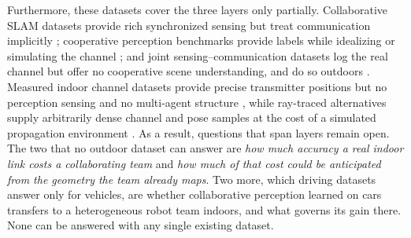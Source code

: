 \documentclass[journal]{IEEEtran}
\begin{document}
Furthermore, these datasets cover the three layers only partially.
Collaborative SLAM datasets provide rich synchronized sensing but
treat communication implicitly \cite{s3e,kimeramulti,coped};
cooperative perception benchmarks provide labels while idealizing or
simulating the channel \cite{opv2v,dairv2x,v2v4real}; and joint
sensing--communication datasets log the real channel but offer no
cooperative scene understanding, and do so outdoors
\cite{deepsense6g}. Measured indoor channel datasets provide precise
transmitter positions but no perception sensing and no multi-agent
structure \cite{dichasus}, while ray-traced alternatives supply
arbitrarily dense channel and pose samples at the cost of a simulated
propagation environment \cite{deepmimo}. As a result, questions that
span layers remain open. The two that no outdoor dataset can answer are
\emph{how much accuracy a real indoor link costs a collaborating team}
and \emph{how much of that cost could be anticipated from the geometry
the team already maps}. Two more, which driving datasets answer only
for vehicles, are whether collaborative perception learned on cars
transfers to a heterogeneous robot team indoors, and what governs its
gain there. None can be answered with any single existing dataset.
\end{document}
